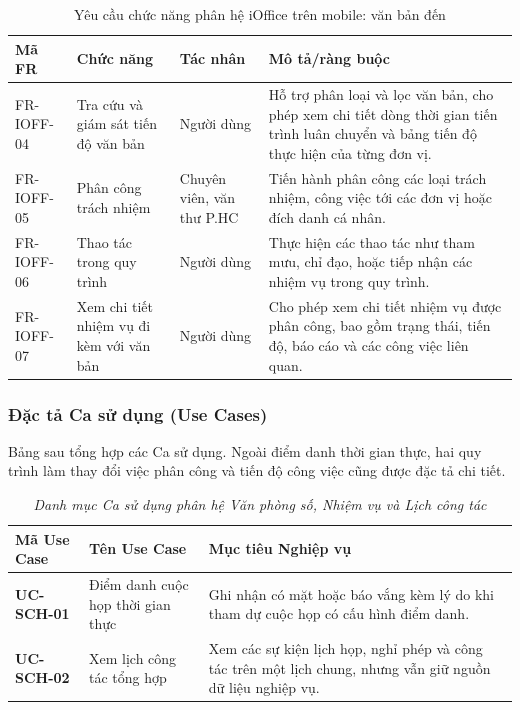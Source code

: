 \begin{table}[H]
\centering
\small
\caption{Yêu cầu chức năng phân hệ iOffice trên mobile: văn bản đến}
\label{tab:fr_ioffice_indoc}
\begin{tabularx}{\textwidth}{|L{1.8cm}|L{3.0cm}|L{2.3cm}|Y|}
\hline
\textbf{Mã FR} & \textbf{Chức năng} & \textbf{Tác nhân} & \textbf{Mô tả/ràng buộc} \\
\hline
FR-IOFF-04 & Tra cứu và giám sát tiến độ văn bản & Người dùng & Hỗ trợ phân loại và lọc văn bản, cho phép xem chi tiết dòng thời gian tiến trình luân chuyển và bảng tiến độ thực hiện của từng đơn vị. \\
\hline
FR-IOFF-05 & Phân công trách nhiệm & Chuyên viên, văn thư P.HC & Tiến hành phân công các loại trách nhiệm, công việc tới các đơn vị hoặc đích danh cá nhân. \\
\hline
FR-IOFF-06 & Thao tác trong quy trình & Người dùng & Thực hiện các thao tác như tham mưu, chỉ đạo, hoặc tiếp nhận các nhiệm vụ trong quy trình. \\
\hline
FR-IOFF-07 & Xem chi tiết nhiệm vụ đi kèm với văn bản & Người dùng & Cho phép xem chi tiết nhiệm vụ được phân công, bao gồm trạng thái, tiến độ, báo cáo và các công việc liên quan. \\
\hline
\end{tabularx}
\end{table}
\subsubsection{Đặc tả Ca sử dụng (Use Cases)}

Bảng sau tổng hợp các Ca sử dụng. Ngoài điểm danh thời gian thực, hai quy trình làm thay đổi việc phân công và tiến độ công việc cũng được đặc tả chi tiết.

\begin{table}[H]
\centering
\caption[\textit{Danh mục Use Case phân hệ iOffice}]{\textit{Danh mục Ca sử dụng phân hệ Văn phòng số, Nhiệm vụ và Lịch công tác}}
\label{tab:mapping_uc_ioffice}
\vspace{0.15cm}
\begin{tabularx}{\textwidth}{|>{\RaggedRight\arraybackslash\small}p{2.8cm}|>{\RaggedRight\arraybackslash\small}p{4.2cm}|Y|}
\hline
\textbf{Mã Use Case} & \textbf{Tên Use Case} & \textbf{Mục tiêu Nghiệp vụ} \\
\hline
\textbf{UC-SCH-01} & Điểm danh cuộc họp thời gian thực & Ghi nhận có mặt hoặc báo vắng kèm lý do khi tham dự cuộc họp có cấu hình điểm danh. \\
\hline
\textbf{UC-SCH-02} & Xem lịch công tác tổng hợp & Xem các sự kiện lịch họp, nghỉ phép và công tác trên một lịch chung, nhưng vẫn giữ nguồn dữ liệu nghiệp vụ. \\
\hline
\end{tabularx}
\end{table}

